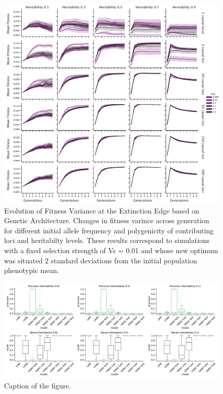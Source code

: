 \documentclass{article}
\begin{document}
\begin{figure}[b]
    \centering
    \includegraphics[width=1\textwidth]{figures/var_fitness_across_gen.pdf}
    \caption{Evolution of Fitness Variance at the Extinction Edge based on Genetic Architecture. Changes in fitness varince across generation for different initial allele frequency and polygenicity of contributing loci and heritabilty levels. These results correspond to simulations with a fixed selection strength of Vs = 0.01 and whose new optimum was situated 2 standard deviations from the initial population phenotypic mean.}
    \label{fig:var_fitness_across_gen}
\end{figure}

\begin{figure}[b]
    \centering
    \includegraphics[width=1\textwidth]{figures/metrics_boxplots-1.pdf}
    \caption{Caption of the figure.}
    \label{fig:metrics_boxplots}
\end{figure}
\end{document}
